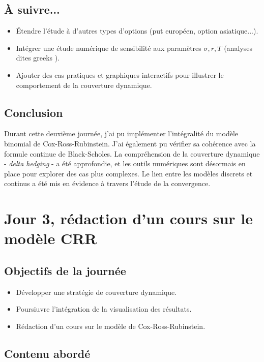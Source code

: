 \documentclass[a4paper,11pt]{article}
\begin{document}
\subsection{À suivre...}
\begin{itemize}
    \item Étendre l’étude à d’autres types d’options (put européen, option asiatique...).
    \item Intégrer une étude numérique de sensibilité aux paramètres \( \sigma, r, T \) (analyses dites \og greeks \fg).
    \item Ajouter des cas pratiques et graphiques interactifs pour illustrer le comportement de la couverture dynamique.
\end{itemize}

\subsection{Conclusion}
Durant cette deuxième journée, j'ai pu implémenter l’intégralité du modèle binomial de Cox-Ross-Rubinstein. J'ai également pu vérifier sa cohérence avec la formule continue de Black-Scholes. La compréhension de la couverture dynamique - \textit{delta hedging} - a été approfondie, et les outils numériques sont désormais en place pour explorer des cas plus complexes. Le lien entre les modèles discrets et continus a été mis en évidence à travers l’étude de la convergence.

\newpage


\section{Jour 3, rédaction d'un cours sur le modèle CRR}
\subsection{Objectifs de la journée}
\begin{itemize}
    \item Développer une stratégie de couverture dynamique.
    \item Poursiuvre l'intégration de la visualisation des résultats.
    \item Rédaction d'un cours sur le modèle de Cox-Ross-Rubinstein.
\end{itemize}
\subsection{Contenu abordé}
\end{document}
